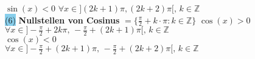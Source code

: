 \documentclass[landscape, 10pt]{article}
\begin{document}
\begin{multicols}{3}
                            \textcolor{NavyBlue}{
                            $\sin(x)<0$\quad
                            $\forall x\in](2k+1)\pi,(2k+2)\pi[,\,k\in\mathbb{Z}$}\\ 
                     \colorbox{SkyBlue}{(6)} 
                            \textbf{Nullstellen von Cosinus}
                            \textcolor{NavyBlue}{
                            $=\{\frac{\pi}{2}+k\cdot\pi:k\in\mathbb{Z}\}$}
                            \textcolor{NavyBlue}{$\cos(x)>0$\quad
                            $\forall x\in]-\frac{\pi}{2}+2k\pi,\,-\frac{\pi}{2}+(2k+1)\pi[,\,
                            k\in\mathbb{Z}$} \\
                            \textcolor{NavyBlue}{$\cos(x)<0$\\ 
                            $\forall x\in]-\frac{\pi}{2}+(2k+1)\pi,\,
                            -\frac{\pi}{2}+(2k+2)\pi[,\,
                            k\in\mathbb{Z}$}\\

\end{multicols}
\end{document}
